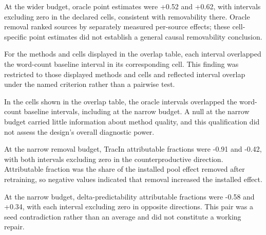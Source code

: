 \documentclass[10pt]{article}
\begin{document}
At the wider budget, oracle point estimates were +0.52 and +0.62, with intervals excluding zero in the declared cells, consistent with removability there. Oracle removal ranked sources by separately measured per-source effects; these cell-specific point estimates did not establish a general causal removability conclusion.



For the methods and cells displayed in the overlap table, each interval overlapped the word-count baseline interval in its corresponding cell. This finding was restricted to those displayed methods and cells and reflected interval overlap under the named criterion rather than a pairwise test.



In the cells shown in the overlap table, the oracle intervals overlapped the word-count baseline intervals, including at the narrow budget. A null at the narrow budget carried little information about method quality, and this qualification did not assess the design’s overall diagnostic power.



At the narrow removal budget, TracIn attributable fractions were -0.91 and -0.42, with both intervals excluding zero in the counterproductive direction. Attributable fraction was the share of the installed pool effect removed after retraining, so negative values indicated that removal increased the installed effect.



At the narrow budget, delta-predictability attributable fractions were -0.58 and +0.34, with each interval excluding zero in opposite directions. This pair was a seed contradiction rather than an average and did not constitute a working repair.
\end{document}
